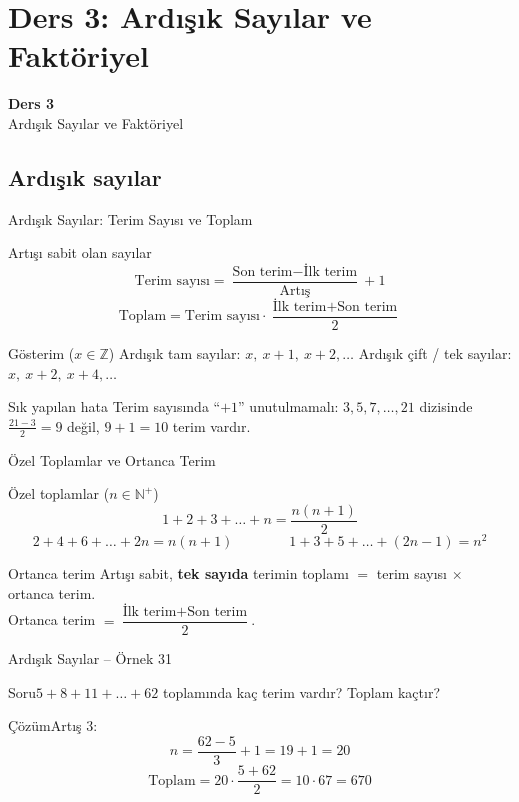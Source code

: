 \documentclass[aspectratio=169,11pt,handout]{beamer}
\newcommand{\soru}[3]{%
\begin{frame}{#1}
  \begin{block}{Soru}\large #2\end{block}
  \pause
  \begin{exampleblock}{Çözüm}\large #3\end{exampleblock}
\end{frame}}
\begin{document}
\section{Ders 3: Ardışık Sayılar ve Faktöriyel}
\begin{frame}
\centering\Large\color{anamavi}\textbf{Ders 3}\\[6pt]\normalsize Ardışık Sayılar ve Faktöriyel
\end{frame}

\subsection{Ardışık sayılar}
\begin{frame}{Ardışık Sayılar: Terim Sayısı ve Toplam}
\begin{block}{Artışı sabit olan sayılar}
\[\text{Terim sayısı}=\frac{\text{Son terim}-\text{İlk terim}}{\text{Artış}}+1\]
\[\text{Toplam}=\text{Terim sayısı}\cdot\frac{\text{İlk terim}+\text{Son terim}}{2}\]
\end{block}
\begin{block}{Gösterim (\(x\in\mathbb{Z}\))}
Ardışık tam sayılar: \(x,\ x+1,\ x+2,\dots\) \qquad Ardışık çift / tek sayılar: \(x,\ x+2,\ x+4,\dots\)
\end{block}
\begin{alertblock}{Sık yapılan hata}
Terim sayısında ``\(+1\)'' unutulmamalı: \(3,5,7,\dots,21\) dizisinde \(\frac{21-3}{2}=9\) değil, \(9+1=10\) terim vardır.
\end{alertblock}
\end{frame}

\begin{frame}{Özel Toplamlar ve Ortanca Terim}
\begin{block}{Özel toplamlar (\(n\in\mathbb{N}^{+}\))}
\[1+2+3+\dots+n=\frac{n(n+1)}{2}\]
\[2+4+6+\dots+2n=n(n+1)\qquad\qquad 1+3+5+\dots+(2n-1)=n^2\]
\end{block}
\begin{block}{Ortanca terim}
Artışı sabit, \textbf{tek sayıda} terimin toplamı \(=\) terim sayısı \(\times\) ortanca terim.\\
Ortanca terim \(=\dfrac{\text{İlk terim}+\text{Son terim}}{2}\).
\end{block}
\end{frame}

\soru{Ardışık Sayılar -- Örnek 31}
{\(5+8+11+\dots+62\) toplamında kaç terim vardır? Toplam kaçtır?}
{Artış \(3\):
\[n=\frac{62-5}{3}+1=19+1=20\]
\[\text{Toplam}=20\cdot\frac{5+62}{2}=10\cdot 67=670\]}
\end{document}
